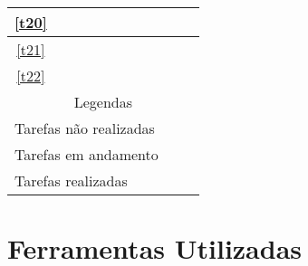 \begin{table}[!htbp]
\begin{tabular}{|c|c|c|c|c|c|c|c|c|c|c|}
      \hline
      \ref{t20}&&&&&&&&\cellcolor{red}&\cellcolor{red}&\\
      \hline
      \ref{t21}&&&&&&&&&\cellcolor{red}&\cellcolor{red}\\
      \hline
      \ref{t22}&&&&&&&&\cellcolor{red}&\cellcolor{red}&\cellcolor{red}\\
      \hline
      \multicolumn{11}{|c|}{Legendas}\\ \hline
      \multicolumn{10}{|l|}{Tarefas não realizadas} &\cellcolor{red}\\
      \hline
      \multicolumn{10}{|l|}{Tarefas em andamento} &\cellcolor{yellow}\\
      \hline
      \multicolumn{10}{|l|}{Tarefas realizadas}&\cellcolor{green}\\
      \hline
      \end{tabular}
  \end{table}

  \section[Ferramentas Utilizadas]{Ferramentas Utilizadas}
